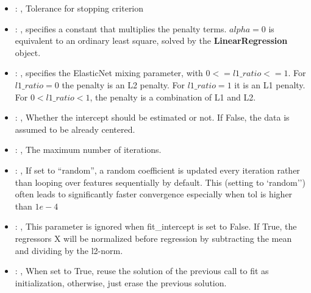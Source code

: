 \begin{itemize}
    \item {}: , 
      Tolerance for stopping criterion

    \item {}: , 
      specifies a constant                                                  that multiplies the
      penalty terms.                                                  $alpha = 0$ is equivalent to
      an ordinary least square, solved by the
      \textbf{LinearRegression} object.

    \item {}: , 
      specifies the                                                  ElasticNet mixing parameter,
      with $0 <= l1\_ratio <= 1$.                                                  For $l1\_ratio =
      0$ the penalty is an L2 penalty.                                                  For
      $l1\_ratio = 1$ it is an L1 penalty.                                                  For $0 <
      l1\_ratio < 1$, the penalty is a combination of L1 and L2.

    \item {}: , 
      Whether the intercept should be estimated or not. If False,
      the data is assumed to be already centered.

    \item {}: , 
      The maximum number of iterations.

    \item {}: , 
      If set to ``random'', a random coefficient is updated every iteration
      rather than looping over features sequentially by default. This (setting to `random'')
      often leads to significantly faster convergence especially when tol is higher than $1e-4$

    \item {}: , 
      This parameter is ignored when fit\_intercept is set to False. If True,
      the regressors X will be normalized before regression by subtracting the mean and
      dividing by the l2-norm.

    \item {}: , 
      When set to True, reuse the solution of the previous call
      to fit as initialization, otherwise, just erase the previous solution.
  \end{itemize}
